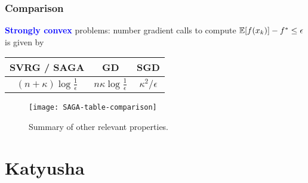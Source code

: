 \documentclass[aspectratio=149]{beamer}
\begin{document}
\begin{frame}
  \frametitle{Comparison}


  \textbf{\textcolor{blue}{Strongly convex}} problems: number gradient calls to compute $\mathbb{E} [f(x_k)] - f^* \le \epsilon$ is given by
  \begin{center}
    \begin{tabular}{c c c}
      SVRG / SAGA  & GD & SGD \\
      \midrule
      $(n + \kappa) \log \frac{1}{\epsilon}$ & $n \kappa \log \frac{1}{\epsilon}$ & $\kappa^2 / \epsilon$
    \end{tabular}
  \end{center}
  \vspace{1cm}
  \begin{figure}[ht]
    \centering
    \texttt{[image: SAGA-table-comparison]}
    \caption{Summary of other relevant properties.}
  \end{figure}


\end{frame}

\section{Katyusha}%
\label{sec:}
\end{document}
